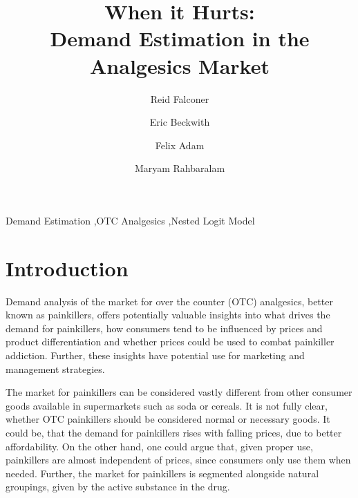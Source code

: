 \documentclass[12pt, authoryear]{elsarticle}
\begin{document}
\begin{frontmatter}  %

\title{When it Hurts: \\ \vspace{0.5cm} \large Demand Estimation in the Analgesics Market}

\author[Add1]{Reid Falconer}

\author[Add1]{Eric Beckwith}

\author[Add1]{Felix Adam}
\author[Add1]{Maryam Rahbaralam}

\address[Add1]{Barcelona Graduate School of Economics, Barcelona, Spain}




\begin{keyword}
\footnotesize{
Demand Estimation  \sep OTC Analgesics \sep  Nested Logit Model \\ \vspace{0.3cm}
}
\end{keyword}
\vspace{0.5cm}
\end{frontmatter}

\headsep 35pt %


\section{Introduction} \label{introduction}
Demand analysis of the market for over the counter (OTC) analgesics, better known as painkillers, offers potentially valuable insights into what drives the demand for painkillers, how consumers tend to be influenced by prices and product differentiation and whether prices could be used to combat painkiller addiction. Further, these insights have potential use for marketing and management strategies.

The market for painkillers can be considered vastly different from other consumer goods available in supermarkets such as soda or cereals. It is not fully clear, whether OTC painkillers should be considered normal or necessary goods. It could be, that the demand for painkillers rises with falling prices, due to better affordability. On the other hand, one could argue that, given proper use, painkillers are almost independent of prices, since consumers only use them when needed. Further, the market for painkillers is segmented alongside natural groupings, given by the active substance in the drug.
\end{document}
